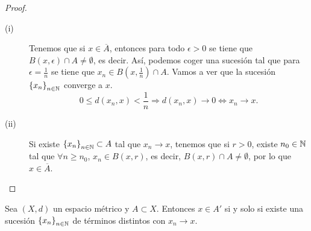 \begin{proof}
\begin{description}
	\item[(i)] Tenemos que si $\displaystyle x \in \overline{A} $, entonces para todo $\displaystyle \epsilon > 0 $ se tiene que $\displaystyle B\left(x,\epsilon \right) \cap A \neq \emptyset $, es decir. Así, podemos coger una sucesión tal que para $\displaystyle \epsilon = \frac{1}{n} $ se tiene que $\displaystyle x_{n} \in B\left(x,\frac{1}{n}\right) \cap A $. Vamos a ver que la sucesión $\displaystyle \left\{ x_{n}\right\} _{n\in\mathbb{N}} $ converge a $\displaystyle x $. 
		\[0 \leq d\left(x_{n}, x\right) < \frac{1}{n} \Rightarrow d\left(x_{n}, x\right) \to 0 \iff x_{n} \to x .\]
	\item[(ii)] Si existe $\displaystyle \left\{ x_{n}\right\} _{n\in\mathbb{N}} \subset A $ tal que $\displaystyle x_{n} \to x $, tenemos que si $\displaystyle r > 0 $, existe $\displaystyle n_{0} \in \mathbb{N} $ tal que $\displaystyle \forall n \geq n_{0} $, $\displaystyle x_{n} \in B\left(x, r\right) $, es decir, $\displaystyle B\left(x,r\right) \cap A \neq \emptyset $, por lo que $\displaystyle x \in \overline{A} $.
\end{description}
\end{proof}
\begin{prop}
	Sea $\displaystyle \left(X,d\right) $ un espacio métrico y $\displaystyle A \subset X $. Entonces $\displaystyle x \in A' $ si y solo si existe una sucesión $\displaystyle \left\{ x_{n}\right\} _{n\in\mathbb{N}} $ de términos distintos con $\displaystyle x_{n} \to x $.
\end{prop}
